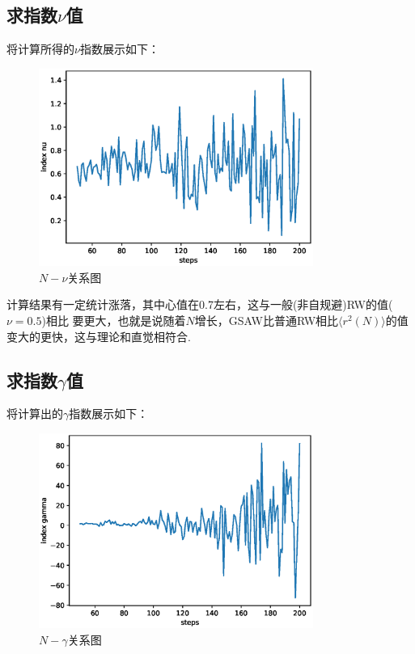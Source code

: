 \documentclass[12pt,a4paper,utf8]{ctexart}
\begin{document}
\subsection{求指数$\nu$值}

将计算所得的$\nu$指数展示如下：
\begin{figure}[!t]
    \centering
    \includegraphics[width=0.8\textwidth]{fig1.eps}
    \caption{$N-\nu$关系图}
\end{figure}

计算结果有一定统计涨落，其中心值在0.7左右，这与一般(非自规避)RW的值($\nu=0.5$)相比
要更大，也就是说随着$N$增长，GSAW比普通RW相比$ \langle r^2(N) \rangle
$的值变大的更快，这与理论和直觉相符合.

\subsection{求指数$\gamma$值}

将计算出的$\gamma$指数展示如下：
\begin{figure}[!h]
    \centering
    \includegraphics[width=0.8\textwidth]{fig2.eps}
    \caption{$N-\gamma$关系图}
\end{figure}
\end{document}
